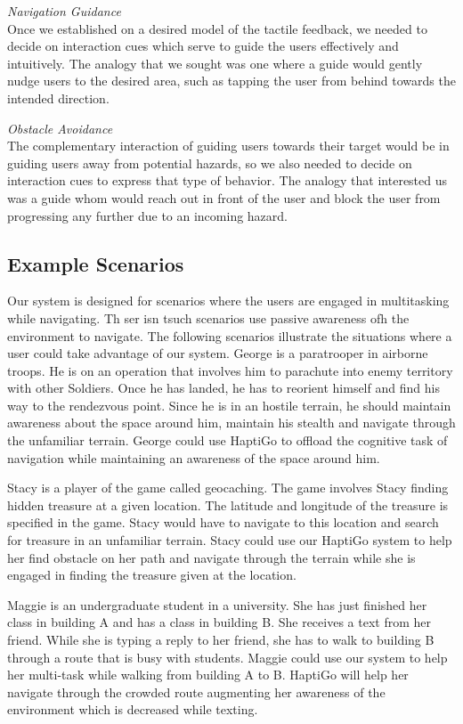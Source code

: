 \documentclass{sigchi}
\begin{document}
\textit{Navigation Guidance}\\
Once we established on a desired model of the tactile feedback, we needed to decide on interaction cues which serve to guide the users effectively and intuitively.  The analogy that we sought was one where a guide would gently nudge users to the desired area, such as tapping the user from behind towards the intended direction.

\textit{Obstacle Avoidance}\\
The complementary interaction of guiding users towards their target would be in guiding users away from potential hazards, so we also needed to decide on interaction cues to express that type of behavior.  The analogy that interested us was a guide whom would reach out in front of the user and block the user from progressing any further due to an incoming hazard.

\subsection{Example Scenarios}
Our system is designed for scenarios where the users are engaged in multitasking while navigating. Th ser isn tsuch scenarios use passive awareness ofh the environment to navigate. The following scenarios illustrate the situations where a user could take advantage of our system. George is a paratrooper in airborne troops. He is on an operation that involves him to parachute into enemy territory with other Soldiers. Once he has landed, he has to reorient himself and find his way to the rendezvous point. Since he is in an hostile terrain, he should maintain awareness about the space around him, maintain his stealth and navigate through the unfamiliar terrain. George could use HaptiGo to offload the cognitive task of navigation while maintaining an awareness of the space around him.

Stacy is a player of the game called geocaching. The game involves Stacy finding hidden treasure at a given location. The latitude and longitude of the treasure is specified in the game. Stacy would have to navigate to this location and search for treasure in an unfamiliar terrain. Stacy could use our HaptiGo system to help her find obstacle on her path and navigate through the terrain while she is engaged in finding the treasure given at the location.

Maggie is an undergraduate student in a university. She has just finished her class in building A and has a class in building B. She receives a text from her friend. While she is typing a reply to her friend, she has to walk to building B through a route that is busy with students. Maggie could use our system to help her multi-task while walking from building A to B. HaptiGo will help her navigate through the crowded route augmenting her awareness of the environment which is decreased while texting.
\end{document}
